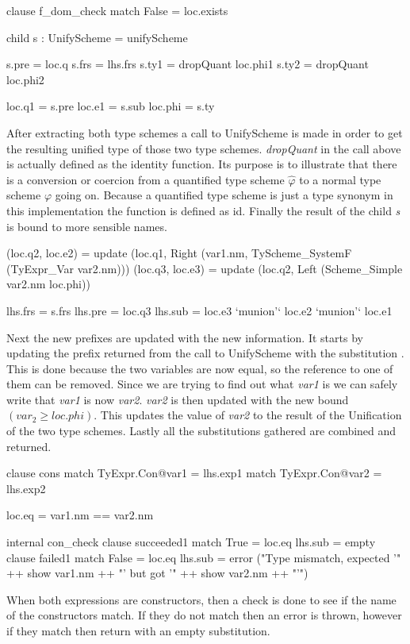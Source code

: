 \begin{code}
clause f_dom_check
  match False = loc.exists
  
  child s : UnifyScheme = unifyScheme
  
  s.pre = loc.q
  s.frs = lhs.frs
  s.ty1 = dropQuant loc.phi1
  s.ty2 = dropQuant loc.phi2
  
  loc.q1  = s.pre
  loc.e1  = s.sub
  loc.phi = s.ty
\end{code}
After extracting both type schemes a call to UnifyScheme is made in order to get the resulting unified type of those two type schemes. \emph{dropQuant} in the call above is actually defined as the identity function. Its purpose is to illustrate that there is a conversion or coercion from a quantified type scheme $\hat{\varphi}$ to a normal type scheme $\varphi$ going on. Because a quantified type scheme is just a type synonym in this implementation the function is defined as id. Finally the result of the child \emph{s} is bound to more sensible names.

\begin{code}                            
(loc.q2, loc.e2)
  = update (loc.q1, Right (var1.nm, TyScheme_SystemF (TyExpr_Var var2.nm)))
(loc.q3, loc.e3) 
  = update (loc.q2, Left (Scheme_Simple var2.nm loc.phi)) 

lhs.frs = s.frs
lhs.pre = loc.q3
lhs.sub = loc.e3 `munion'` loc.e2 `munion'` loc.e1
\end{code}
Next the new prefixes are updated with the new information. It starts by updating the prefix returned from the call to UnifyScheme with the substitution . This is done because the two variables are now equal, so the reference to one of them can be removed. Since we are trying to find out what \emph{var1} is we can safely write that \emph{var1} is now \emph{var2}. \emph{var2} is then updated with the new bound $(var_2 \geq loc.phi)$. This updates the value of \emph{var2} to the result of the Unification of the two type schemes. Lastly all the substitutions gathered are combined and returned.

\begin{code}
clause cons
  match TyExpr.Con@var1 = lhs.exp1
  match TyExpr.Con@var2 = lhs.exp2
  
  loc.eq = var1.nm == var2.nm
  
  internal con_check
     clause succeeded1
       match True  = loc.eq
       lhs.sub     = empty
     clause failed1
       match False = loc.eq
       lhs.sub = error ("Type mismatch, expected '" ++ show var1.nm ++ "' but got '" ++ show var2.nm ++ "'")
\end{code}
When both expressions are constructors, then a check is done to see if the name of the constructors match. If they do not match then an error is thrown, however if they match then return with an empty substitution.

